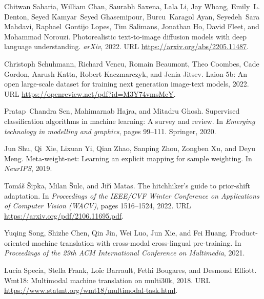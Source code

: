 \documentclass{bmvc2k}
\begin{document}
\begin{thebibliography}{63}
Chitwan Saharia, William Chan, Saurabh Saxena, Lala Li, Jay Whang, Emily~L.
  Denton, Seyed Kamyar~Seyed Ghasemipour, Burcu~Karagol Ayan, Seyedeh~Sara
  Mahdavi, Raphael~Gontijo Lopes, Tim Salimans, Jonathan Ho, David Fleet, and
  Mohammad Norouzi.
\newblock Photorealistic text-to-image diffusion models with deep language
  understanding.
\newblock \emph{arXiv}, 2022.
\newblock URL \url{https://arxiv.org/abs/2205.11487}.

Christoph Schuhmann, Richard Vencu, Romain Beaumont, Theo Coombes, Cade Gordon,
  Aarush Katta, Robert Kaczmarczyk, and Jenia Jitsev.
\newblock Laion-5b: An open large-scale dataset for training next generation
  image-text models, 2022.
\newblock URL \url{https://openreview.net/pdf?id=M3Y74vmsMcY}.

Pratap~Chandra Sen, Mahimarnab Hajra, and Mitadru Ghosh.
\newblock Supervised classification algorithms in machine learning: A survey
  and review.
\newblock In \emph{Emerging technology in modelling and graphics}, pages
  99--111. Springer, 2020.

Jun Shu, Qi~Xie, Lixuan Yi, Qian Zhao, Sanping Zhou, Zongben Xu, and Deyu Meng.
\newblock Meta-weight-net: Learning an explicit mapping for sample weighting.
\newblock In \emph{NeurIPS}, 2019.

Tom{\'a}{\v{s}} {\v{S}}ipka, Milan {\v{S}}ulc, and Ji{\v{r}}{\'\i} Matas.
\newblock The hitchhiker's guide to prior-shift adaptation.
\newblock In \emph{Proceedings of the IEEE/CVF Winter Conference on
  Applications of Computer Vision (WACV)}, pages 1516--1524, 2022.
\newblock URL \url{https://arxiv.org/pdf/2106.11695.pdf}.

Yuqing Song, Shizhe Chen, Qin Jin, Wei Luo, Jun Xie, and Fei Huang.
\newblock Product-oriented machine translation with cross-modal cross-lingual
  pre-training.
\newblock In \emph{Proceedings of the 29th {ACM} International Conference on
  Multimedia}, 2021.

Lucia Specia, Stella Frank, Loïc Barrault, Fethi Bougares, and Desmond
  Elliott.
\newblock Wmt18: Multimodal machine translation on multi30k, 2018.
\newblock URL \url{https://www.statmt.org/wmt18/multimodal-task.html}.


\end{thebibliography}
\end{document}
